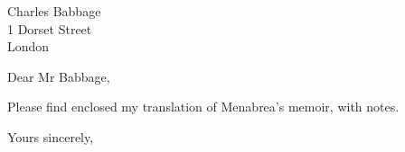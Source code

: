 \documentclass[fromalign=right,fromphone,fromemail,parskip=half]{scrlttr2}
\begin{document}
\begin{letter}{Charles Babbage\\1 Dorset Street\\London}
\opening{Dear Mr Babbage,}
Please find enclosed my translation of Menabrea's memoir, with notes.
\closing{Yours sincerely,}
\end{letter}
\end{document}
